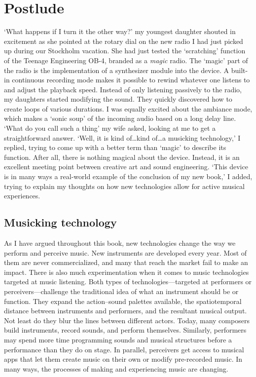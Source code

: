 \chapter{Postlude}

`What happens if I turn it the other way?' my youngest daughter shouted in excitement as she pointed at the rotary dial on the new radio I had just picked up during our Stockholm vacation. She had just tested the `scratching' function of the Teenage Engineering OB-4, branded as a \emph{magic} radio. The `magic' part of the radio is the implementation of a synthesizer module into the device. A built-in continuous recording mode makes it possible to rewind whatever one listens to and adjust the playback speed. Instead of only listening passively to the radio, my daughters started modifying the sound. They quickly discovered how to create loops of various durations. I was equally excited about the ambiance mode, which makes a `sonic soup' of the incoming audio based on a long delay line. `What do you call such a thing' my wife asked, looking at me to get a straightforward answer. `Well, it is kind of\ldots kind of\ldots a musicking technology,' I replied, trying to come up with a better term than `magic' to describe its function. After all, there is nothing magical about the device. Instead, it is an excellent meeting point between creative art and sound engineering. `This device is in many ways a real-world example of the conclusion of my new book,' I added, trying to explain my thoughts on how new technologies allow for active musical experiences.

\section{Musicking technology}

As I have argued throughout this book, new technologies change the way we perform and perceive music. New instruments are developed every year. Most of them are never commercialized, and many that reach the market fail to make an impact. There is also much experimentation when it comes to music technologies targeted at music listening. Both types of technologies---targeted at performers or perceivers---challenge the traditional idea of what an instrument should be or function. They expand the action--sound palettes available, the spatiotemporal distance between instruments and performers, and the resultant musical output. Not least do they blur the lines between different actors. Today, many composers build instruments, record sounds, and perform themselves. Similarly, performers may spend more time programming sounds and musical structures before a performance than they do on stage. In parallel, perceivers get access to musical apps that let them create music on their own or modify pre-recorded music. In many ways, the processes of making and experiencing music are changing.

